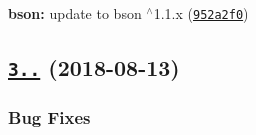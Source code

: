 \begin{DoxyItemize}
\item {\bfseries bson\+:} update to bson $^\wedge$1.1.\+x (\href{https://github.com/mongodb-js/mongodb-core/commit/952a2f0}{\tt 952a2f0})
\end{DoxyItemize}

\label{_3.1.1}%
 \subsection*{\href{https://github.com/mongodb-js/mongodb-core/compare/v3.0.6...v3.1.1}{\tt 3..} (2018-\/08-\/13)}

\subsubsection*{Bug Fixes}


